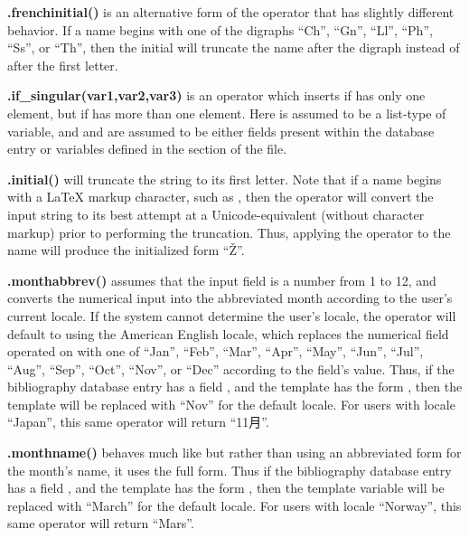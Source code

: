 \documentclass[letterpaper,10pt,english]{sphinxmanual}
\begin{document}
\textbf{.frenchinitial()} is an alternative form of the  operator that has slightly different behavior. If a name begins with one of the digraphs
``Ch'', ``Gn'', ``Ll'', ``Ph'', ``Ss'', or ``Th'', then the initial will truncate the name after the digraph instead of after the first letter.

\textbf{.if\_singular(var1,var2,var3)} is an operator which inserts  if  has only one element, but  if  has more than one element. Here  is assumed to be a list-type of variable, and  and  are assumed to be either fields present within the database entry or variables defined in the  section of the file.

\textbf{.initial()} will truncate the string to its first letter. Note that if a name begins with a LaTeX markup character, such as , then the operator will convert the input string to its best attempt at a Unicode-equivalent (without character markup) prior to performing the truncation. Thus, applying the  operator to the name  will produce the initialized form ``Ž''.

\textbf{.monthabbrev()} assumes that the input field is a number from 1 to 12, and converts the numerical input into the abbreviated month according to the user's current locale. If the system cannot determine the user's locale, the operator will default to using the American English locale, which replaces the numerical field operated on with one of ``Jan'', ``Feb'', ``Mar'', ``Apr'', ``May'', ``Jun'', ``Jul'', ``Aug'', ``Sep'', ``Oct'', ``Nov'', or ``Dec'' according to the field's value. Thus, if the bibliography database entry has a field , and the template has the form , then the template will be replaced with ``Nov'' for the default locale. For users with locale ``Japan'', this same operator will return ``11月''.

\textbf{.monthname()} behaves much like  but rather than using an abbreviated form for the month's name, it uses the full form. Thus if the bibliography database entry has a field , and the template has the form , then the template variable will be replaced with ``March'' for the default locale. For users with locale ``Norway'', this same operator will return ``Mars''.
\end{document}
